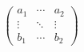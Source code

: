 $$ \left(\begin{array}{ccc}{a}_{1}& \cdots & {a}_{2}\\ ⋮& \ddots & ⋮\\ {b}_{1}& \cdots & {b}_{2}\end{array}\right)$$
